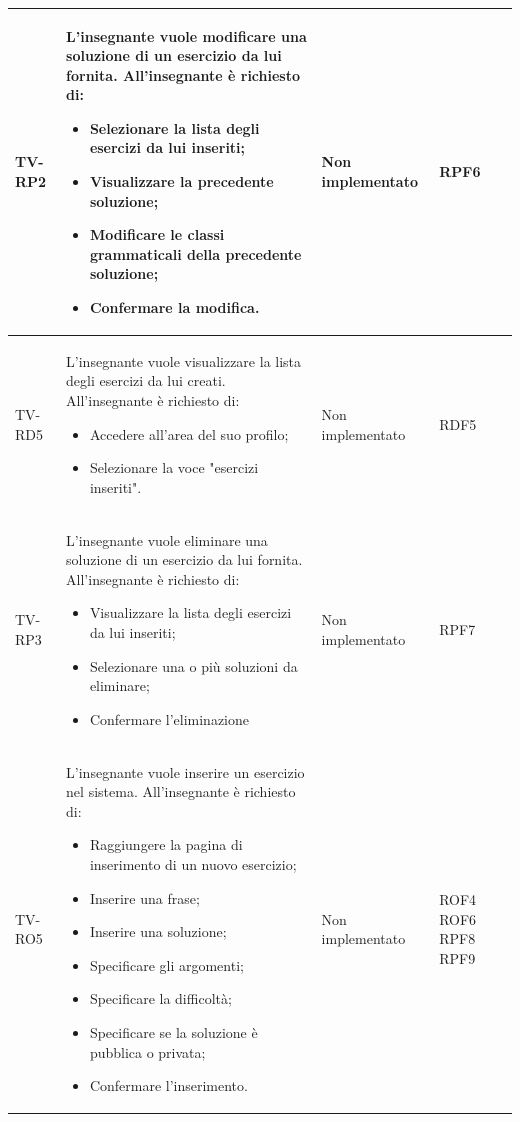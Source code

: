 \begin{longtable}{|>{\centering\arraybackslash}m{1.6cm}|>{\centering\arraybackslash}m{6.41cm}|>{\centering\arraybackslash}m{3.1cm} | >{\centering\arraybackslash}m{2.6cm}|}
		  \rowcolor{LightGray}
		TV-RP2 & L'insegnante vuole modificare una soluzione di un esercizio da lui fornita. All'insegnante è richiesto di: 
		\begin{itemize}
			\item Selezionare la lista degli esercizi da lui inseriti;
			\item Visualizzare la precedente soluzione;
			\item Modificare le classi grammaticali della precedente soluzione;
			\item Confermare la modifica.
		\end{itemize}& Non implementato  & RPF6 \\ \hline
		TV-RD5 & L'insegnante vuole visualizzare la lista degli esercizi da lui creati. All'insegnante è richiesto di: 
		\begin{itemize}
			\item Accedere all'area del suo profilo;
			\item Selezionare la voce "esercizi inseriti".
		\end{itemize}& Non implementato  & RDF5 \\ \hline
		  \rowcolor{LightGray}
		TV-RP3 & L'insegnante vuole eliminare una soluzione di un esercizio da lui fornita. All'insegnante è richiesto di:
		\begin{itemize}
			\item Visualizzare la lista degli esercizi da lui inseriti;
			\item Selezionare una o più soluzioni da eliminare;
			\item Confermare l'eliminazione
		\end{itemize}& Non implementato  & RPF7 \\ \hline
		TV-RO5 & L'insegnante vuole inserire un esercizio nel sistema. All'insegnante è richiesto di: 
		\begin{itemize}
			\item Raggiungere la pagina di inserimento di un nuovo esercizio;
			\item Inserire una frase;
			\item Inserire una soluzione;
			\item Specificare gli argomenti;
			\item Specificare la difficoltà;
			\item Specificare se la soluzione è pubblica o privata;
			\item Confermare l'inserimento.
		\end{itemize}& Non implementato  & ROF4 ROF6 RPF8 RPF9\\ \hline

\end{longtable}

